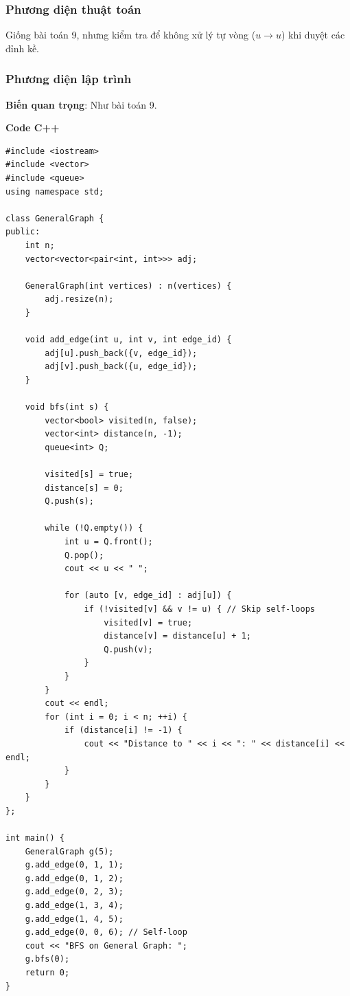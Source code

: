 \documentclass[a4paper,12pt]{article}
\begin{document}
\subsubsection{Phương diện thuật toán}
Giống bài toán 9, nhưng kiểm tra để không xử lý tự vòng (\( u \to u \)) khi duyệt các đỉnh kề.

\subsubsection{Phương diện lập trình}
\textbf{Biến quan trọng}: Như bài toán 9.

\textbf{Code C++}
\lstset{language=C++}
\begin{lstlisting}
#include <iostream>
#include <vector>
#include <queue>
using namespace std;

class GeneralGraph {
public:
    int n;
    vector<vector<pair<int, int>>> adj;

    GeneralGraph(int vertices) : n(vertices) {
        adj.resize(n);
    }

    void add_edge(int u, int v, int edge_id) {
        adj[u].push_back({v, edge_id});
        adj[v].push_back({u, edge_id});
    }

    void bfs(int s) {
        vector<bool> visited(n, false);
        vector<int> distance(n, -1);
        queue<int> Q;

        visited[s] = true;
        distance[s] = 0;
        Q.push(s);

        while (!Q.empty()) {
            int u = Q.front();
            Q.pop();
            cout << u << " ";

            for (auto [v, edge_id] : adj[u]) {
                if (!visited[v] && v != u) { // Skip self-loops
                    visited[v] = true;
                    distance[v] = distance[u] + 1;
                    Q.push(v);
                }
            }
        }
        cout << endl;
        for (int i = 0; i < n; ++i) {
            if (distance[i] != -1) {
                cout << "Distance to " << i << ": " << distance[i] << endl;
            }
        }
    }
};

int main() {
    GeneralGraph g(5);
    g.add_edge(0, 1, 1);
    g.add_edge(0, 1, 2);
    g.add_edge(0, 2, 3);
    g.add_edge(1, 3, 4);
    g.add_edge(1, 4, 5);
    g.add_edge(0, 0, 6); // Self-loop
    cout << "BFS on General Graph: ";
    g.bfs(0);
    return 0;
}
\end{lstlisting}
\end{document}
